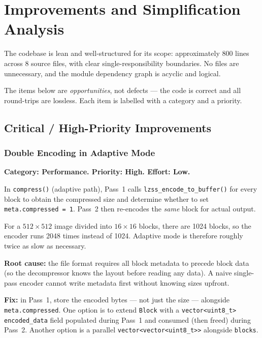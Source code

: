 \section{Improvements and Simplification Analysis}

The codebase is lean and well-structured for its scope:
approximately 800 lines across 8 source files, with clear single-responsibility boundaries.
No files are unnecessary, and the module dependency graph is acyclic and logical.

The items below are \emph{opportunities}, not defects --- the code is correct and all
round-trips are lossless.
Each item is labelled with a category and a priority.

\subsection{Critical / High-Priority Improvements}

\subsubsection{Double Encoding in Adaptive Mode}

\textbf{Category: Performance. Priority: High. Effort: Low.}

In \texttt{compress()} (adaptive path), Pass~1 calls \texttt{lzss\_encode\_to\_buffer()}
for every block to obtain the compressed size and determine whether to set
\texttt{meta.compressed = 1}.
Pass~2 then re-encodes the \emph{same} block for actual output.

For a $512 \times 512$ image divided into $16 \times 16$ blocks, there are 1024 blocks,
so the encoder runs 2048 times instead of 1024.
Adaptive mode is therefore roughly twice as slow as necessary.

\textbf{Root cause:} the file format requires all block metadata to precede block data
(so the decompressor knows the layout before reading any data).
A naive single-pass encoder cannot write metadata first without knowing sizes upfront.

\textbf{Fix:} in Pass~1, store the encoded bytes --- not just the size --- alongside
\texttt{meta.compressed}.
One option is to extend \texttt{Block} with a \texttt{vector\textless uint8\_t\textgreater{} encoded\_data}
field populated during Pass~1 and consumed (then freed) during Pass~2.
Another option is a parallel \texttt{vector\textless vector\textless uint8\_t\textgreater\textgreater{}} alongside \texttt{blocks}.

